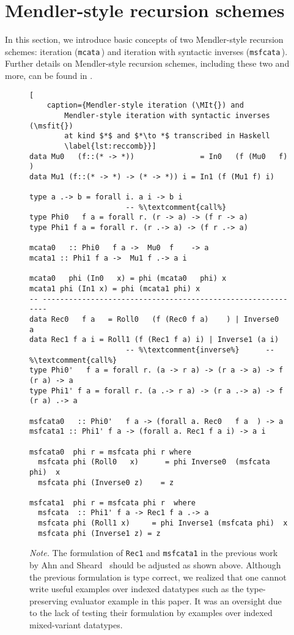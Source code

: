 \section{Mendler-style recursion schemes}
\label{sec:mendler}
In this section, we introduce basic concepts of two Mendler-style recursion
schemes: iteration (\lstinline{mcata}\,) and iteration with syntactic inverses
(\lstinline{msfcata}\,). Further details on Mendler-style recursion schemes,
including these two and more,
can be found in \cite{AhnShe11,AbeMatUus05,UusVen00,AbeMat04}.

\begin{figure}
\begin{lstlisting}[
	caption={Mendler-style iteration (\MIt{}) and
		Mendler-style iteration with syntactic inverses (\msfit{})
		at kind $*$ and $*\to *$ transcribed in Haskell
		\label{lst:reccomb}}]
data Mu0   (f::(* -> *))               = In0   (f (Mu0   f)  )
data Mu1 (f::(* -> *) -> (* -> *)) i = In1 (f (Mu1 f) i)

type a .-> b = forall i. a i -> b i
                      -- %\textcomment{call%}
type Phi0   f a = forall r. (r -> a) -> (f r -> a)
type Phi1 f a = forall r. (r .-> a) -> (f r .-> a)

mcata0   :: Phi0   f a ->  Mu0  f    -> a
mcata1 :: Phi1 f a ->  Mu1 f .-> a i

mcata0   phi (In0   x) = phi (mcata0   phi) x
mcata1 phi (In1 x) = phi (mcata1 phi) x
-- ------------------------------------------------------------
data Rec0   f a   = Roll0   (f (Rec0 f a)    ) | Inverse0   a
data Rec1 f a i = Roll1 (f (Rec1 f a) i) | Inverse1 (a i)
                      -- %\textcomment{inverse%}      -- %\textcomment{call%}
type Phi0'   f a = forall r. (a -> r a) -> (r a -> a) -> f (r a) -> a
type Phi1' f a = forall r. (a .-> r a) -> (r a .-> a) -> f (r a) .-> a

msfcata0   :: Phi0'   f a -> (forall a. Rec0   f a  ) -> a
msfcata1 :: Phi1' f a -> (forall a. Rec1 f a i) -> a i

msfcata0  phi r = msfcata phi r where
  msfcata phi (Roll0   x)      = phi Inverse0  (msfcata phi)  x
  msfcata phi (Inverse0 z)    = z

msfcata1  phi r = msfcata phi r  where
  msfcata  :: Phi1' f a -> Rec1 f a .-> a
  msfcata phi (Roll1 x)     = phi Inverse1 (msfcata phi)  x
  msfcata phi (Inverse1 z) = z
\end{lstlisting}

\textit{Note.}
The formulation of \lstinline{Rec1} and \lstinline{msfcata1} in
the previous work by Ahn and Sheard~\cite{AhnShe11} should be adjusted
as shown above. Although the previous formulation is type correct,
we realized that one cannot write useful examples over indexed datatypes
such as the type-preserving evaluator example in this paper. It was
an oversight due to the lack of testing their formulation
by examples over indexed mixed-variant datatypes.
\end{figure}

